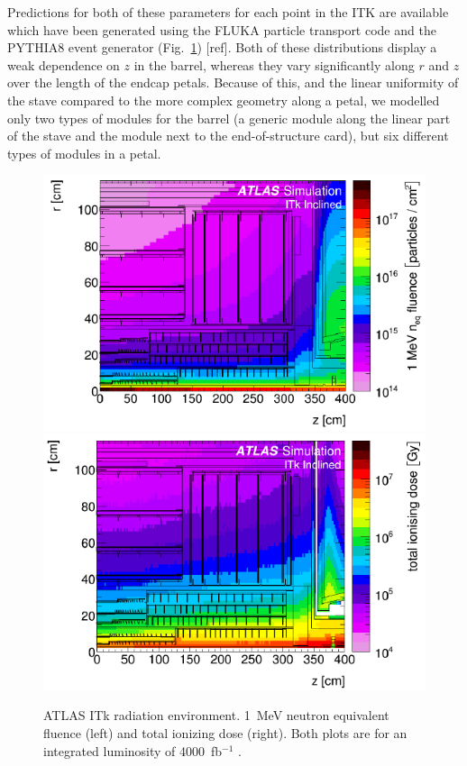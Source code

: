 Predictions for both of these parameters for each point in the ITK are available which have been generated using the FLUKA particle transport code and the PYTHIA8 event generator (Fig.~\ref{fig:radiation}) [ref]. Both of these distributions display a weak dependence on $z$ in the barrel, whereas they vary significantly along $r$ and $z$ over the length of the endcap petals. Because of this, and the linear uniformity of the stave compared to the more complex geometry along a petal, we modelled only two types of modules for the barrel (a generic module along the linear part of the stave and the module next to the end-of-structure card), but six different types of modules in a petal.

\begin{figure}[ht]
\centering
\includegraphics[width=0.48\linewidth]{figures/fluence.pdf}\quad
\includegraphics[width=0.48\linewidth]{figures/TID.pdf}
\caption{ATLAS ITk radiation environment. 1~MeV neutron equivalent fluence (left) and total ionizing dose (right). Both plots are for an integrated luminosity of 4000~fb$^{-1}$ \cite{Collaboration:2017mtb}.}
\label{fig:radiation}
\end{figure}
